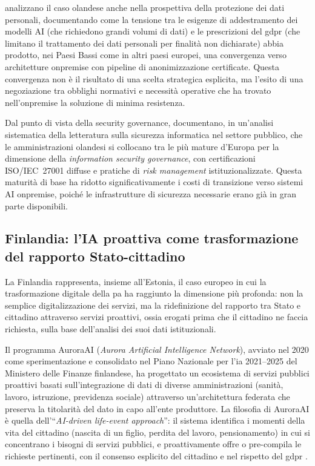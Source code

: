 \textcite{RohatgiPark2025} analizzano il caso olandese anche nella prospettiva della
protezione dei dati personali, documentando come la tensione tra le esigenze di
addestramento dei modelli AI (che richiedono grandi volumi di dati) e le prescrizioni
del \gls{gdpr} (che limitano il trattamento dei dati personali per finalità non
dichiarate) abbia prodotto, nei Paesi Bassi come in altri paesi europei, una
convergenza verso architetture \gls{onpremise} con pipeline di anonimizzazione
certificate. Questa convergenza non è il risultato di una scelta strategica esplicita,
ma l'esito di una negoziazione tra obblighi normativi e necessità operative che ha
trovato nell'\gls{onpremise} la soluzione di minima resistenza.

Dal punto di vista della security governance, \textcite{MagnussonIqbal2025}
documentano, in un'analisi sistematica della letteratura sulla sicurezza
informatica nel settore pubblico, che le amministrazioni olandesi si collocano
tra le più mature d'Europa per la dimensione della \textit{information security
governance}, con certificazioni ISO/IEC~27001 diffuse e pratiche di
\textit{risk management} istituzionalizzate. Questa maturità di base ha ridotto
significativamente i costi di transizione verso sistemi AI \gls{onpremise},
poiché le infrastrutture di sicurezza necessarie erano già in gran parte disponibili.

\subsection{Finlandia: l'IA proattiva come trasformazione del rapporto Stato-cittadino}

La Finlandia rappresenta, insieme all'Estonia, il caso europeo in cui la trasformazione
digitale della \gls{pa} ha raggiunto la dimensione più profonda: non la semplice
digitalizzazione dei servizi, ma la ridefinizione del rapporto tra Stato e cittadino
attraverso servizi proattivi, ossia erogati prima che il cittadino ne faccia
richiesta, sulla base dell'analisi dei suoi dati istituzionali.

Il programma AuroraAI (\textit{Aurora Artificial Intelligence Network}),
avviato nel 2020 come sperimentazione e consolidato nel Piano Nazionale per l'\gls{ia}
2021--2025 del Ministero delle Finanze finlandese, ha progettato un ecosistema di
servizi pubblici proattivi basati sull'integrazione di dati di diverse amministrazioni
(sanità, lavoro, istruzione, previdenza sociale) attraverso un'architettura federata
che preserva la titolarità del dato in capo all'ente produttore. La filosofia
di AuroraAI è quella dell'``\textit{AI-driven life-event approach}'': il sistema
identifica i momenti della vita del cittadino (nascita di un figlio, perdita del lavoro,
pensionamento) in cui si concentrano i bisogni di servizi pubblici, e
proattivamente offre o pre-compila le richieste pertinenti, con il consenso esplicito
del cittadino e nel rispetto del \gls{gdpr} \parencite{OECDGoverningAI2025}.

